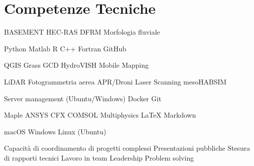 
\section{Competenze Tecniche}

BASEMENT \textbullet{} HEC-RAS \textbullet{} DFRM \textbullet{} Morfologia fluviale
\sectionsep

Python \textbullet{} Matlab \textbullet{} R \textbullet{} C++ \textbullet{} Fortran \textbullet{} GitHub
\sectionsep

QGIS \textbullet{} Grass \textbullet{} GCD \textbullet{} HydroVISH \textbullet{} Mobile Mapping
\sectionsep

LiDAR \textbullet{} Fotogrammetria aerea \textbullet{} APR/Droni \textbullet{} Laser Scanning \textbullet{} mesoHABSIM
\sectionsep

Server management (Ubuntu/Windows) \textbullet{} Docker \textbullet{} Git
\sectionsep

Maple \textbullet{} ANSYS CFX \textbullet{} COMSOL Multiphysics \textbullet{} LaTeX \textbullet{} Markdown
\sectionsep

macOS \textbullet{} Windows \textbullet{} Linux (Ubuntu)
\sectionsep

Capacità di coordinamento di progetti complessi \textbullet{} Presentazioni pubbliche \textbullet{} Stesura di rapporti tecnici \textbullet{} Lavoro in team \textbullet{} Leadership \textbullet{} Problem solving
\sectionsep
